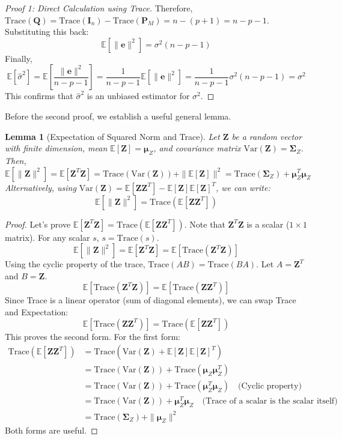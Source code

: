 \documentclass[11pt, letterpaper]{article}
\newtheorem{lemma}[theorem]{Lemma}
\theoremstyle{definition}
\newcommand{\E}{\mathbb{E}}
\newcommand{\Var}{\text{Var}}
\newcommand{\Trace}{\text{Trace}}
\newcommand{\mat}[1]{\mathbf{#1}} %
\newcommand{\vect}[1]{\boldsymbol{#1}} %
\newcommand{\T}{^T} %
\begin{document}
\begin{proof}[Proof 1: Direct Calculation using Trace]
Therefore, $\Trace(\mat{Q}) = \Trace(\mat{I}_n) - \Trace(\mat{P}_M) = n - (p+1) = n - p - 1$.
Substituting this back:
\[
\E[\|\vect{e}\|^2] = \sigma^2 (n - p - 1)
\]
Finally,
\[
\E[\hat{\sigma}^2] = \E\left[\frac{\|\vect{e}\|^2}{n - p - 1}\right] = \frac{1}{n - p - 1} \E[\|\vect{e}\|^2] = \frac{1}{n - p - 1} \sigma^2 (n - p - 1) = \sigma^2
\]
This confirms that $\hat{\sigma}^2$ is an unbiased estimator for $\sigma^2$.
\end{proof}

Before the second proof, we establish a useful general lemma.

\begin{lemma}[Expectation of Squared Norm and Trace]
Let $\vect{Z}$ be a random vector with finite dimension, mean $\E[\vect{Z}] = \vect{\mu}_Z$, and covariance matrix $\Var(\vect{Z}) = \mat{\Sigma}_Z$. Then,
\[
\E[\|\vect{Z}\|^2] = \E[\vect{Z}\T\vect{Z}] = \Trace(\Var(\vect{Z})) + \|\E[\vect{Z}]\|^2 = \Trace(\mat{\Sigma}_Z) + \vect{\mu}_Z\T\vect{\mu}_Z
\]
Alternatively, using $\Var(\vect{Z}) = \E[\vect{Z}\vect{Z}\T] - \E[\vect{Z}]\E[\vect{Z}]\T$, we can write:
\[
\E[\|\vect{Z}\|^2] = \Trace(\E[\vect{Z}\vect{Z}\T])
\]
\end{lemma}

\begin{proof}
Let's prove $\E[\vect{Z}\T\vect{Z}] = \Trace(\E[\vect{Z}\vect{Z}\T])$.
Note that $\vect{Z}\T\vect{Z}$ is a scalar ($1 \times 1$ matrix). For any scalar $s$, $s = \Trace(s)$.
\[
\E[\|\vect{Z}\|^2] = \E[\vect{Z}\T\vect{Z}] = \E[\Trace(\vect{Z}\T\vect{Z})]
\]
Using the cyclic property of the trace, $\Trace(AB) = \Trace(BA)$. Let $A = \vect{Z}\T$ and $B = \vect{Z}$.
\[
\E[\Trace(\vect{Z}\T\vect{Z})] = \E[\Trace(\vect{Z}\vect{Z}\T)]
\]
Since Trace is a linear operator (sum of diagonal elements), we can swap Trace and Expectation:
\[
\E[\Trace(\vect{Z}\vect{Z}\T)] = \Trace(\E[\vect{Z}\vect{Z}\T])
\]
This proves the second form. For the first form:
\begin{align*}
\Trace(\E[\vect{Z}\vect{Z}\T]) &= \Trace(\Var(\vect{Z}) + \E[\vect{Z}]\E[\vect{Z}]\T) \\
&= \Trace(\Var(\vect{Z})) + \Trace(\vect{\mu}_Z\vect{\mu}_Z\T) \\
&= \Trace(\Var(\vect{Z})) + \Trace(\vect{\mu}_Z\T\vect{\mu}_Z) \quad \text{(Cyclic property)} \\
&= \Trace(\Var(\vect{Z})) + \vect{\mu}_Z\T\vect{\mu}_Z \quad \text{(Trace of a scalar is the scalar itself)} \\
&= \Trace(\mat{\Sigma}_Z) + \|\vect{\mu}_Z\|^2
\end{align*}
Both forms are useful.
\end{proof}
\end{document}
